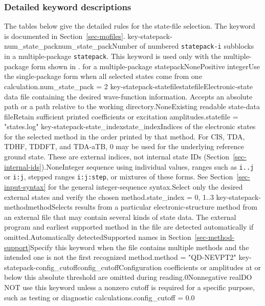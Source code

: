 \subsubsection*{Detailed keyword descriptions}
The tables below give the detailed rules for the state-file selection.
The  keyword is documented in Section~\ref{sec-mofiles}.
\keyword
{key-statepack-num_state_pack}{num\_state\_pack}{Number of numbered \texttt{statepack-i} subblocks in a multiple-package \texttt{statepack}. This keyword is used only with the multiple-package form shown in .}{\OpRequired{} for a multiple-package statepack}{\OpInt}{None}{Positive integer}{Use the single-package form when all selected states come from one calculation.}{num\_state\_pack = 2}
\keyword
{key-statepack-statefile}{statefile}{Electronic-state data file containing the desired wave-function information. Accepts an absolute path or a path relative to the working directory.}{\OpRequired}{\OpString}{None}{Existing readable state-data file}{Retain sufficient printed coefficients or excitation amplitudes.}{statefile = "states.log"}
\keyword
{key-statepack-state_index}{state\_index}{Indices of the electronic states for the selected method in the order printed by that method. For CIS, TDA, TDHF, TDDFT, and TDA-aTB, 0 may be used for the underlying reference ground state. These are external indices, not internal state IDs (Section~\ref{sec-internal-ids}).}{\OpRequired}{\OpIntseq}{None}{Integer sequence using individual values, ranges such as \texttt{i..j} or \texttt{i:j}, stepped ranges \texttt{i:j:step}, or mixtures of these forms. See Section~\ref{sec-input-syntax} for the general integer-sequence syntax.}{Select only the desired external states and verify the chosen method.}{state\_index = 0, 1..3}
\keyword
{key-statepack-method}{method}{Selects results from a particular electronic-structure method from an external file that may contain several kinds of state data. The external program and earliest supported method in the file are detected automatically if omitted.}{\OpOptional}{\OpString}{Automatically detected}{Supported names in Section~\ref{sec-method-support}}{Specify this keyword when the file contains multiple methods and the intended one is not the first recognized method.}{method = "QD-NEVPT2"}
\keyword
{key-statepack-config_cutoff}{config\_cutoff}{Configuration coefficients or amplitudes at or below this absolute threshold are omitted during reading.}{\OpOptional}{\OpReal}{0}{Nonnegative real}{DO NOT use this keyword unless a nonzero cutoff is required for a specific purpose, such as testing or diagnostic calculations.}{config\_cutoff = 0.0}
